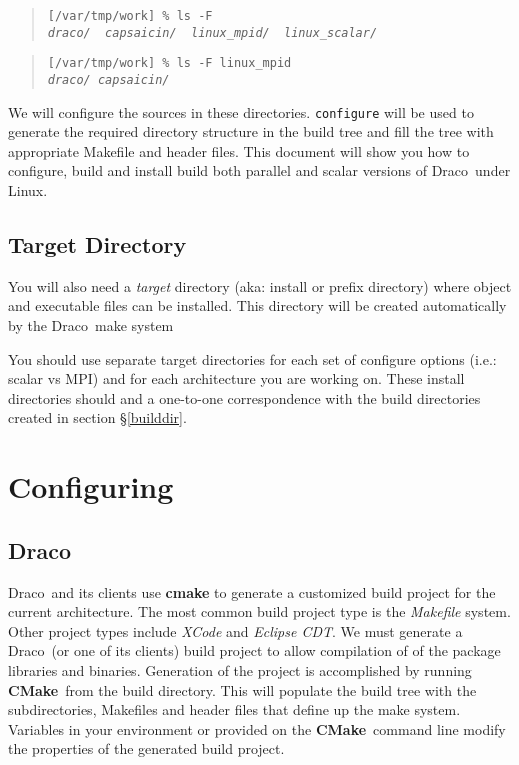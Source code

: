 \documentclass[11pt]{nmemo}
\newcommand{\comp}[1]{\normalfont\footnotesize\texttt{#1}\normalsize}
\newcommand{\draco}{{\normalfont\sffamily Draco}}
\newcommand{\cmake}{{\normalfont\bfseries CMake}}
\begin{document}
\footnotesize
\begin{verse}
\texttt{[/var/tmp/work] \% ls -F \\
\emph{draco/\ \ capsaicin/\ \ linux\_mpid/\ \ linux\_scalar/ }}
\end{verse}

\begin{verse}
\texttt{[/var/tmp/work] \% ls -F linux\_mpid \\
\emph{draco/  capsaicin/}}
\end{verse}
\normalsize

We will configure the sources in these directories.  \comp{configure}
will be used to generate the required directory structure in the build
tree and fill the tree with appropriate Makefile and header files.
This document will show you how to configure, build and install build
both parallel and scalar versions of \draco\ under Linux.

\subsection{Target Directory}

You will also need a \emph{target} directory (aka: install or prefix
directory) where object and executable files can be installed.  This
directory will be created automatically by the \draco\ make system

You should use separate target directories for each set of configure
options (i.e.: scalar vs MPI) and for each architecture you are
working on.  These install directories should and a one-to-one
correspondence with the build directories created in section
\S\ref{builddir}.


\section{Configuring}
\label{configure}

\subsection{\draco}

\draco\ and its clients use \textbf{cmake} to generate a customized
build project for the current architecture.  The most common build
project type is the \textit{Makefile} system.  Other project types
include \textit{XCode} and \textit{Eclipse CDT}.  We must generate a
\draco\ (or one of its clients) build project to allow compilation of
of the package libraries and binaries.  Generation of the project is
accomplished by running \cmake\ from the build directory.  This will
populate the build tree with the subdirectories, Makefiles and header
files that define up the make system.  Variables in your environment
or provided on the \cmake\ command line modify the properties of the
generated build project.
\end{document}
